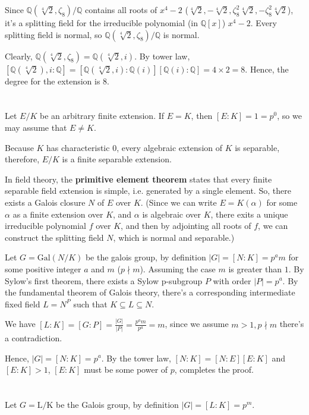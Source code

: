 \documentclass{article}
\begin{document}
Since $\mathbb{Q}(\sqrt[4]{2}, \zeta_8)/\mathbb{Q}$ contains all roots of $x^4-2$ ($\sqrt[4]{2}, -\sqrt[4]{2}, \zeta_8^2\sqrt[4]{2}, -\zeta_8^2\sqrt[4]{2}$), it's a splitting field for the irreducible polynomial (in $\mathbb{Q}[x]$) $x^4-2$. Every splitting field is normal, so $\mathbb{Q}(\sqrt[4]{2}, \zeta_8)/\mathbb{Q}$ is normal.

Clearly, $\mathbb{Q}(\sqrt[4]{2}, \zeta_8)=\mathbb{Q}(\sqrt[4]{2}, i)$. By tower law, $[\mathbb{Q}(\sqrt[4]{2}), i:\mathbb{Q}]=[\mathbb{Q}(\sqrt[4]{2}, i):\mathbb{Q}(i)][\mathbb{Q}(i):\mathbb{Q}]=4\times 2=8$. Hence, the degree for the extension is $8$.

\section{}
Let $E/K$ be an arbitrary finite extension. If $E=K$, then $[E:K]=1=p^0$, so we may assume that $E\ne K$.

Because $K$ has characteristic 0, every algebraic extension of $K$ is separable, therefore, $E/K$ is a finite separable extension.

In field theory, the \textbf{primitive element theorem} states that every finite separable field extension is simple, i.e. generated by a single element. So, there exists a Galois closure $N$ of $E$ over $K$. (Since we can write $E=K(\alpha)$ for some $\alpha$ as a finite extension over $K$, and $\alpha$ is algebraic over $K$, there exits a unique irreducible polynomial $f$ over $K$, and then by adjointing all roots of $f$, we can construct the splitting field $N$, which is normal and separable.)

Let $G=\mathrm{Gal}(N/K)$ be the galois group, by definition $|G|=[N:K]=p^am$ for some positive integer $a$ and $m$ ($p\nmid m$). Assuming the case $m$ is greater than $1$. By Sylow's first theorem, there exists a Sylow p-subgroup $P$ with order $|P|=p^a$. By the fundamental theorem of Galois theory, there's a corresponding intermediate fixed field $L=N^P$ such that $K\subseteq L \subseteq N$.

We have $[L:K]=[G:P]=\frac{|G|}{|P|}=\frac{p^am}{p^a}=m$, since we assume $m>1,p\nmid m$ there's a contradiction.

Hence, $|G|=[N:K]=p^a$. By the tower law, $[N:K]=[N:E][E:K]$ and $[E:K]>1$, $[E:K]$ must be some power of $p$, completes the proof.

\section{}
Let $G=\mathrm{L/K}$ be the Galois group, by definition $|G|=[L:K]=p^m$.
\end{document}

